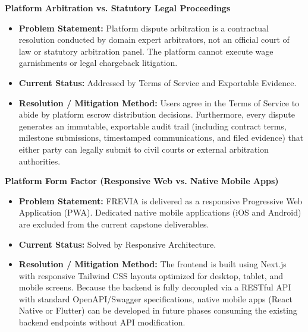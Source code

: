 \begin{description}[leftmargin=2.0cm,labelwidth=1.8cm,align=left,font=\normalfont\bfseries]
\item[LI-08] \textbf{Platform Arbitration vs. Statutory Legal Proceedings}
\begin{itemize}[leftmargin=0.5cm, label=--]
\item \textbf{Problem Statement:} Platform dispute arbitration is a contractual resolution conducted by domain expert arbitrators, not an official court of law or statutory arbitration panel. The platform cannot execute wage garnishments or legal chargeback litigation.
\item \textbf{Current Status:} Addressed by Terms of Service and Exportable Evidence.
\item \textbf{Resolution / Mitigation Method:} Users agree in the Terms of Service to abide by platform escrow distribution decisions. Furthermore, every dispute generates an immutable, exportable audit trail (including contract terms, milestone submissions, timestamped communications, and filed evidence) that either party can legally submit to civil courts or external arbitration authorities.
\end{itemize}

\item[LI-09] \textbf{Platform Form Factor (Responsive Web vs. Native Mobile Apps)}
\begin{itemize}[leftmargin=0.5cm, label=--]
\item \textbf{Problem Statement:} FREVIA is delivered as a responsive Progressive Web Application (PWA). Dedicated native mobile applications (iOS and Android) are excluded from the current capstone deliverables.
\item \textbf{Current Status:} Solved by Responsive Architecture.
\item \textbf{Resolution / Mitigation Method:} The frontend is built using Next.js with responsive Tailwind CSS layouts optimized for desktop, tablet, and mobile screens. Because the backend is fully decoupled via a RESTful API with standard OpenAPI/Swagger specifications, native mobile apps (React Native or Flutter) can be developed in future phases consuming the existing backend endpoints without API modification.
\end{itemize}


\end{description}
